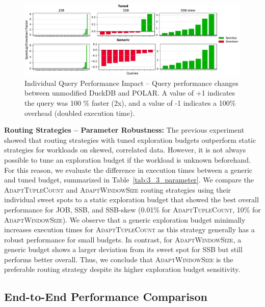 \begin{figure}[!t]
    \centering
    \includegraphics[width=\textwidth]{figures/3_2_rel_gains.pdf}
    \vspace{-0.55cm}
    \caption{Individual Query Performance Impact -- Query performance changes between unmodified DuckDB and POLAR. A value of +1 indicates the query was 100 \% faster (2x), and a value of -1 indicates a 100\% overhead (doubled execution time).}
    \label{fig:3_2_rel_gains}
\end{figure}



\textbf{Routing Strategies -- Parameter Robustness:} The previous experiment showed that routing strategies with tuned exploration budgets outperform static strategies for workloads on skewed, correlated data. However, it is not always possible to tune an exploration budget if the workload is unknown beforehand. For this reason, we evaluate the difference in execution times between a generic and tuned budget, summarized in Table~\ref{tab:3_3_parameter}. We compare the \textsc{AdaptTupleCount} and \textsc{AdaptWindowSize} routing strategies using their individual sweet spots to a static exploration budget that showed the best overall performance for JOB, SSB, and SSB-skew (0.01\% for \textsc{AdaptTupleCount}, 10\% for \textsc{AdaptWindowSize}). We observe that a generic exploration budget minimally increases execution times for \textsc{AdaptTupleCount} as this strategy generally has a robust performance for small budgets. In contrast, for \textsc{AdaptWindowSize}, a generic budget shows a larger deviation from its sweet spot for SSB but still performs better overall. Thus, we conclude that \textsc{AdaptWindowSize} is the preferable routing strategy despite its higher exploration budget sensitivity.

\subsection{End-to-End Performance Comparison}

